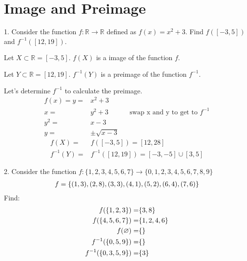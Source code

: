 \documentclass{article}
\begin{document}
\section{Image and Preimage}

\begin{exercise}{}{}
	{1. Consider the function $f: \mathbb{R} \rightarrow \mathbb{R}$ defined as
		$f(x)=x^2+3$. Find $f([-3,5])$ and $f^{-1}([12,19])$.}
	\begin{alist}
		\item Let $X\subset \mathbb{R}= [-3,5]$. $f(X)$ is a image of the function $f$.
		\item Let $Y\subset \mathbb{R}= [12,19]$. $f^{-1}(Y)$ is a preimage of the
		function $f^{-1}$.
	\end{alist}
	Let's determine $f^{-1}$ to calculate the preimage.
	\begin{align*}
		f(x) = y = & x^2+3                                                   \\
		x=         & y^2+3         &  & \text{swap x and y to get to }f^{-1} \\
		y^2=       & x-3                                                     \\
		y=         & \pm\sqrt{x-3}
	\end{align*}
	\begin{align*}
		f(X) =      & f([-3, 5]) = [12, 28]                   \\
		f^{-1}(Y) = & f^{-1}([12, 19]) = [-3, -5] \cup [3, 5]
	\end{align*}
\end{exercise}{}{}


\begin{exercise}{}{}
	{2. Consider the function $f:\{1,2,3,4,5,6,7\} \rightarrow\{0,1,2,3,4,5,6,7,8,9\}$ }
	\begin{align*}
		f=\{(1,3),(2,8),(3,3),(4,1),(5,2),(6,4),(7,6)\}
	\end{align*}
	Find:
	\begin{align*}
		f(\{1,2,3\})=         & \{3, 8\}      \\
		f(\{4,5,6,7\}) =      & \{1, 2, 4, 6\} \\
		f(\varnothing) =        & \{\}           \\
		f^{-1}(\{0,5,9\}) =   & \{\}           \\
		f^{-1}(\{0,3,5,9\}) = & \{3\}          \\
	\end{align*}
\end{exercise}{}{}
\end{document}

